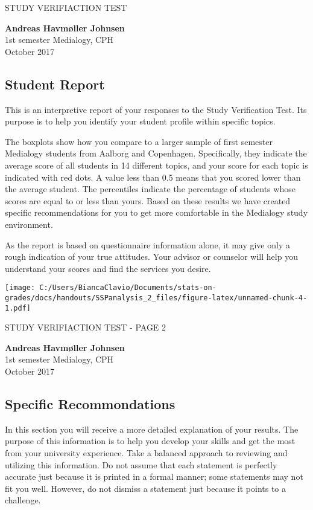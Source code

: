 \documentclass[]{article}
\title{}
\author{}
\date{}
\begin{document}
STUDY VERIFIACTION TEST

\textbf{Andreas Havmøller Johnsen}\\
1st semester Medialogy, CPH\\
October 2017

\subsection{Student Report}\label{student-report}

This is an interpretive report of your responses to the Study
Verification Test. Its purpose is to help you identify your student
profile within specific topics.

The boxplots show how you compare to a larger sample of first semester
Medialogy students from Aalborg and Copenhagen. Specifically, they
indicate the average score of all students in 14 different topics, and
your score for each topic is indicated with red dots. A value less than
0.5 means that you scored lower than the average student. The
percentiles indicate the percentage of students whose scores are equal
to or less than yours. Based on these results we have created specific
recommendations for you to get more comfortable in the Medialogy study
environment.

As the report is based on questionnaire information alone, it may give
only a rough indication of your true attitudes. Your advisor or
counselor will help you understand your scores and find the services you
desire.

\texttt{[image: C:/Users/BiancaClavio/Documents/stats-on-grades/docs/handouts/SSPanalysis\_2\_files/figure-latex/unnamed-chunk-4-1.pdf]}

\pagebreak

STUDY VERIFIACTION TEST - PAGE 2

\textbf{Andreas Havmøller Johnsen}\\
1st semester Medialogy, CPH\\
October 2017

\subsection{Specific Recommondations}\label{specific-recommondations}

In this section you will receive a more detailed explanation of your
results. The purpose of this information is to help you develop your
skills and get the most from your university experience. Take a balanced
approach to reviewing and utilizing this information. Do not assume that
each statement is perfectly accurate just because it is printed in a
formal manner; some statements may not fit you well. However, do not
dismiss a statement just because it points to a challenge.
\end{document}
